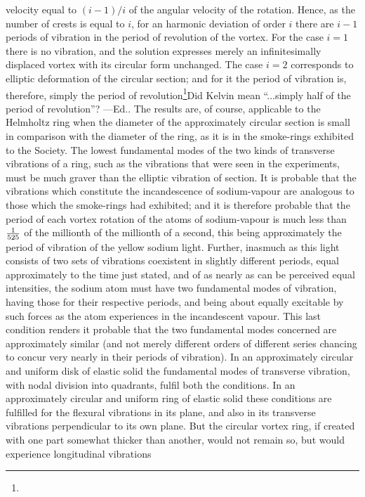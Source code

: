 velocity equal to $(i-1)/i$ of the angular velocity of the rotation. Hence, as
the number of crests is equal to $i$, for an harmonic deviation of order $i$
there are $i-1$ periods of vibration in the period of revolution of the vortex.
For the case $i=1$ there is no vibration, and the solution expresses merely an
infinitesimally displaced vortex with its circular form unchanged. The case
$i=2$ corresponds to elliptic deformation of the circular section; and for it
the period of vibration is, therefore, simply the period of
revolution\footnote{\dag}{Did Kelvin mean ``...simply half of the period of
revolution''? ---Ed.}. The results are, of course, applicable to the Helmholtz
ring when the diameter of the approximately circular section is small in
comparison with the diameter of the ring, as it is in the smoke-rings exhibited
to the Society. The lowest fundamental modes of the two kinds of transverse
vibrations of a ring, such as the vibrations that were seen in the experiments,
must be much graver than the elliptic vibration of section. It is probable that
the vibrations which constitute the incandescence of sodium-vapour are
analogous to those which the smoke-rings had exhibited; and it is therefore
probable that the period of each vortex rotation of the atoms of sodium-vapour
is much less than $1 \over 525$ of the millionth of the millionth of a second,
this being approximately the period of vibration of the yellow sodium light.
Further, inasmuch as this light consists of two sets of vibrations coexistent
in slightly different periods, equal approximately to the time just stated, and
of as nearly as can be perceived equal intensities, the sodium atom must have
two fundamental modes of vibration, having those for their respective periods,
and being about equally excitable by such forces as the atom experiences in the
incandescent vapour. This last condition renders it probable that the two
fundamental modes concerned are approximately similar (and not merely different
orders of different series chancing to concur very nearly in their periods of
vibration). In an approximately circular and uniform disk of elastic solid the
fundamental modes of transverse vibration, with nodal division into quadrants,
fulfil both the conditions. In an approximately circular and uniform ring of
elastic solid these conditions are fulfilled for the flexural vibrations in its
plane, and also in its transverse vibrations perpendicular to its own plane.
But the circular vortex ring, if created with one part somewhat thicker than
another, would not remain so, but would experience longitudinal vibrations

